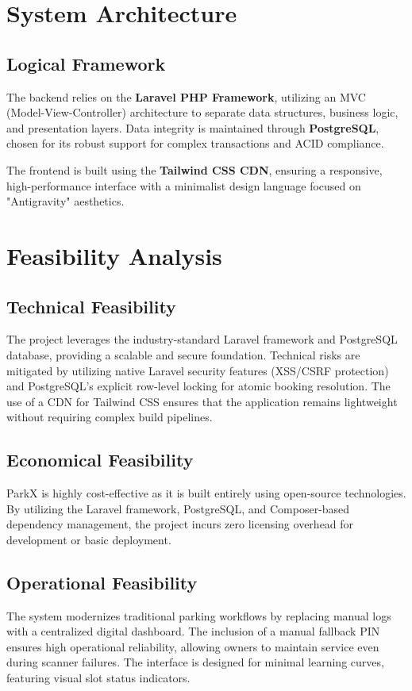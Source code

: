 \section{System Architecture}
\subsection{Logical Framework}
The backend relies on the \textbf{Laravel PHP Framework}, utilizing an MVC (Model-View-Controller) architecture to separate data structures, business logic, and presentation layers. Data integrity is maintained through \textbf{PostgreSQL}, chosen for its robust support for complex transactions and ACID compliance.

The frontend is built using the \textbf{Tailwind CSS CDN}, ensuring a responsive, high-performance interface with a minimalist design language focused on "Antigravity" aesthetics.

\section{Feasibility Analysis}

\subsection{Technical Feasibility}
The project leverages the industry-standard Laravel framework and PostgreSQL database, providing a scalable and secure foundation. Technical risks are mitigated by utilizing native Laravel security features (XSS/CSRF protection) and PostgreSQL's explicit row-level locking for atomic booking resolution. The use of a CDN for Tailwind CSS ensures that the application remains lightweight without requiring complex build pipelines.

\subsection{Economical Feasibility}
ParkX is highly cost-effective as it is built entirely using open-source technologies. By utilizing the Laravel framework, PostgreSQL, and Composer-based dependency management, the project incurs zero licensing overhead for development or basic deployment.

\subsection{Operational Feasibility}
The system modernizes traditional parking workflows by replacing manual logs with a centralized digital dashboard. The inclusion of a manual fallback PIN ensures high operational reliability, allowing owners to maintain service even during scanner failures. The interface is designed for minimal learning curves, featuring visual slot status indicators.

